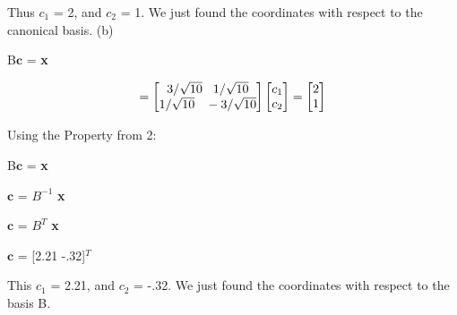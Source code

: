 \documentclass[11pt]{article}
\begin{document}
\vspace{3mm}
Thus $c_1$ = 2, and $c_2$ = 1. We just found the coordinates with respect to the canonical basis.\newline
(b)
\begin{center}

B$\textbf{c}$ = \textbf{x}

\end{center}
\begin{center}

\[
=
\begin{bmatrix}
   3/\sqrt{10} \hspace{3mm}   1/\sqrt{10} \\
   1/\sqrt{10} \hspace{3mm}   -3/\sqrt{10}           
\end{bmatrix}
\begin{bmatrix}
   c_1\\
 c_2 
\end{bmatrix} 
= 
\begin{bmatrix}
   2\\
 1 
\end{bmatrix} 
\]

\end{center}

Using the Property from 2:

\begin{center}

B$\textbf{c}$ = \textbf{x}

\end{center}

\begin{center}

$\textbf{c}$ = $B^{-1}$ \textbf{x}

\end{center}
\begin{center}

$\textbf{c}$ = $B^{T}$ \textbf{x}

\end{center}

\begin{center}

$\textbf{c}$ = [2.21 -.32]$^T$

\end{center}



\vspace{3mm}
This $c_1$ = 2.21, and $c_2$ = -.32. We just found the coordinates with respect to the basis B.
\newpage
\end{document}
